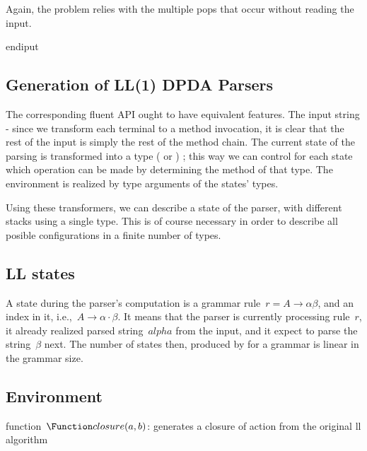 Again, the problem relies with the multiple pops that occur without reading the input.

  

endiput

\subsection{Generation of LL(1) DPDA Parsers}
\label{section:generation}
The corresponding \Java fluent API ought to have equivalent features.
The input string - since we transform each
  terminal to a method invocation, it is clear that the rest of the input is
  simply the rest of the method chain.
The current state of the parsing is transformed into a \Java type
  ( or ) ; this way we can control for each state
  which operation can be made by determining the method of that type.
The environment is realized by type arguments of the states' \Java types.

Using these transformers, we can describe a state of the parser,
  with different stacks using a single type.
This is of course necessary in order to describe all posible configurations
  in a finite number of \Java types.

%
\subsection{LL states}
A state during the parser's computation is a grammar rule~$r = A→αβ$, and an
index in it, i.e.,~$A→α·β$.
It means that the parser is currently processing rule~$r$, it already realized parsed string~$alpha$
  from the input, and it expect to parse the string~$β$ next.
The number of states then, produced by \Fajita for a grammar is linear in the grammar size.

\subsection{Environment}

\begin{algorithm}[p]
  \caption{\label{algorithm:llclosure}
  function~$\Function closure(a,b)$: generates a closure of action from the original ll algorithm}
  \begin{algorithmic}
    \FI
      \ELSE[$x$ must be~$b$]
        \BREAK
      \FI
    \DONE
  \end{algorithmic}
\end{algorithm}
